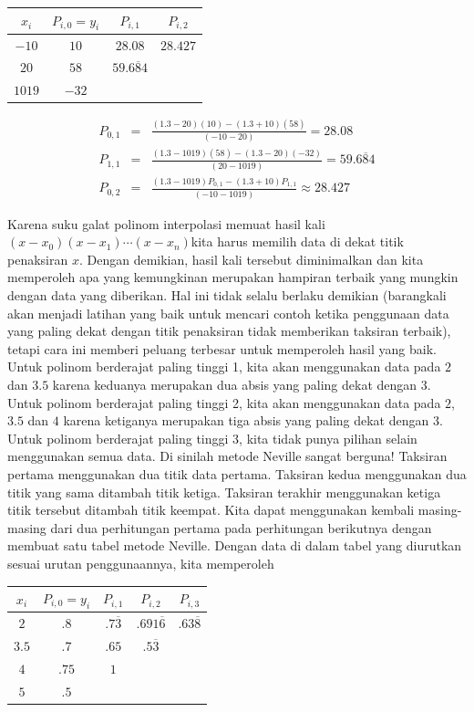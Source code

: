 \begin{description}
\begin{center}
\begin{tabular}{c|ccc}
$x_{i}$ & $P_{i,0}=y_{i}$ & $P_{i,1}$ & $P_{i,2}$\tabularnewline
\hline 
$-10$ & $10$ & $28.08$ & $28.427$\tabularnewline
$20$ & $58$ & $59.\overline{684}$ & \tabularnewline
$1019$ & $-32$ &  & \tabularnewline
\end{tabular}
\begin{eqnarray*}
P_{0,1} & = & \frac{(1.3-20)(10)-(1.3+10)(58)}{(-10-20)}=28.08\\
P_{1,1} & = & \frac{(1.3-1019)(58)-(1.3-20)(-32)}{(20-1019)}=59.\overline{684}\\
P_{0,2} & = & \frac{(1.3-1019)P_{0,1}-(1.3+10)P_{1,1}}{(-10-1019)}\approx28.427
\end{eqnarray*}
\par\end{center}
\item [{\ref{exc:interpolation-lagrange-9}:}] Karena suku galat polinom
interpolasi memuat hasil kali $(x-x_{0})(x-x_{1})\cdots(x-x_{n})$kita
harus memilih data di dekat titik penaksiran $x$. Dengan demikian,
hasil kali tersebut diminimalkan dan kita memperoleh apa yang kemungkinan
merupakan hampiran terbaik yang mungkin dengan data yang diberikan.
Hal ini tidak selalu berlaku demikian (barangkali akan menjadi latihan
yang baik untuk mencari contoh ketika penggunaan data yang paling
dekat dengan titik penaksiran tidak memberikan taksiran terbaik),
tetapi cara ini memberi peluang terbesar untuk memperoleh hasil yang
baik. Untuk polinom berderajat paling tinggi 1, kita akan menggunakan
data pada $2$ dan $3.5$ karena keduanya merupakan dua absis yang
paling dekat dengan $3$. Untuk polinom berderajat paling tinggi 2,
kita akan menggunakan data pada $2$, $3.5$ dan $4$ karena ketiganya
merupakan tiga absis yang paling dekat dengan $3$. Untuk polinom
berderajat paling tinggi 3, kita tidak punya pilihan selain menggunakan
semua data. Di sinilah metode Neville sangat berguna! Taksiran pertama
menggunakan dua titik data pertama. Taksiran kedua menggunakan dua
titik yang sama ditambah titik ketiga. Taksiran terakhir menggunakan
ketiga titik tersebut ditambah titik keempat. Kita dapat menggunakan
kembali masing-masing dari dua perhitungan pertama pada perhitungan
berikutnya dengan membuat satu tabel metode Neville. Dengan data di
dalam tabel yang diurutkan sesuai urutan penggunaannya, kita memperoleh

\begin{center}
\begin{tabular}{c|cccc}
$x_{i}$ & $P_{i,0}=y_{i}$ & $P_{i,1}$ & $P_{i,2}$ & $P_{i,3}$\tabularnewline
\hline 
$2$ & $.8$ & $.7\overline{3}$ & $.691\overline{6}$ & $.63\overline{8}$\tabularnewline
$3.5$ & $.7$ & $.65$ & $.5\overline{3}$ & \tabularnewline
$4$ & $.75$ & $1$ &  & \tabularnewline
$5$ & $.5$ &  &  & \tabularnewline
\end{tabular}
\par\end{center}


\end{description}
